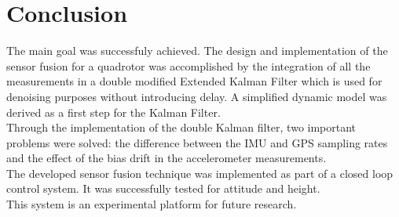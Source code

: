 \documentclass[conference]{IEEEtran}
\begin{document}



\section{Conclusion}
\balance

The main goal was successfuly achieved. The design and implementation of the sensor fusion for a quadrotor was accomplished by the integration of all the measurements in a double modified Extended Kalman Filter which is used for denoising purposes without introducing delay. A simplified dynamic model was derived as a first step for the Kalman Filter. \\

Through the implementation of the double Kalman filter, two important problems were solved: the difference between the IMU and GPS sampling rates and the effect of the bias drift in the accelerometer measurements.\\

The developed sensor fusion technique was implemented as part of a closed loop control system. It was successfully tested for attitude and height. \\

This system is an experimental platform for future research.
 

\end{document}
